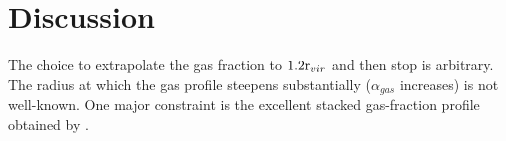 \chapter{Discussion}
\label{chap:Discussion}
The choice to extrapolate the gas fraction to $1.2\textrm{r\ensuremath{_{vir}}}{}$ and then
stop is arbitrary. The radius at which the gas profile steepens
substantially ($\alpha{}_{gas}$ increases) is not well-known. One
major constraint is the excellent stacked gas-fraction profile
obtained by \citet{PlanckIntV}. 

